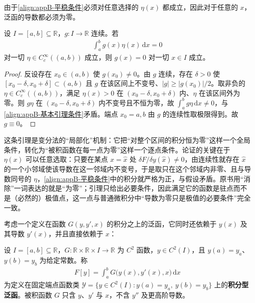 \documentclass[../main.tex]{subfiles}
\begin{document}
由于\eqref{align:appB-平稳条件}必须对任意选择的 $\eta(x)$ 都成立，因此对于任意的 $x$，泛函的导数都必须为零。

\begin{proposition}[变分法的基本引理]\label{proposition:appB-基本引理}
设 $I=[a,b]\subseteq\mathbb{R}$，$g:I\to\mathbb{R}$ 连续。若
\begin{align}
  \int_{a}^{b}g(x)\eta(x)\,\mathrm{d}x=0
  \label{align:appB-基本引理条件}
\end{align}
对一切 $\eta\in C_{c}^{\infty}((a,b))$ 成立，则 $g(x)=0$ 对一切 $x\in I$ 成立。
\end{proposition}

\begin{proof}
反设存在 $x_{0}\in(a,b)$ 使 $g(x_{0})\neq0$。由 $g$ 连续，存在 $\delta>0$ 使 $[x_{0}-\delta,x_{0}+\delta]\subset(a,b)$ 且 $g$ 在该区间上不变号、$|g|\geqslant|g(x_{0})|/2$。取非负的 $\eta\in C_{c}^{\infty}((a,b))$，满足 $\eta(x)>0$ 在 $(x_{0}-\delta,x_{0}+\delta)$ 内、$\eta$ 在该区间外为零。则 $g\eta$ 在 $(x_{0}-\delta,x_{0}+\delta)$ 内不变号且不恒为零，故 $\int_{a}^{b}g\eta\,\mathrm{d}x\neq0$，与\eqref{align:appB-基本引理条件}矛盾。端点 $x_{0}=a,b$ 由 $g$ 的连续性取极限得到。故 $g\equiv0$。
\end{proof}

\begin{remark}
这条引理是变分法的“局部化”机制：它把“对整个区间的积分恒为零”这样一个全局条件，转化为“被积函数在每一点为零”这样一个逐点条件。论证的关键在于 $\eta(x)$ 可以任意选取：只要在某点 $x=\hat{x}$ 处 $\delta F/\delta y(\hat{x})\neq0$，由连续性就存在 $\hat{x}$ 的一个小邻域使该导数在这一邻域内不变号，于是取只在这个邻域内非零、且与导数同号的 $\eta$，\eqref{align:appB-平稳条件}中的积分就严格为正，与假设矛盾。原书用“消除”一词表达的就是“为零”；引理只给出必要条件，因此满足它的函数是驻点而不是（必然的）极值点，这一点与普通微积分中“导数为零只是极值的必要条件”完全一致。
\end{remark}

考虑一个定义在函数 $G(y,y',x)$ 的积分之上的泛函，它同时还依赖于 $y(x)$ 及其导数 $y'(x)$，并且直接依赖于 $x$：
\begin{definition}[积分型泛函]\label{definition:appB-积分型泛函}
设 $I=[a,b]\subseteq\mathbb{R}$，$G:\mathbb{R}\times\mathbb{R}\times I\to\mathbb{R}$ 为 $C^{2}$ 函数，$y\in C^{2}(I)$，且 $y(a)=y_{a}$、$y(b)=y_{b}$ 为给定常数。称
\begin{align}
  F[y]=\int_{a}^{b}G\bigl(y(x),y'(x),x\bigr)\,\mathrm{d}x
  \label{align:appB-积分型泛函}
\end{align}
为定义在固定端点函数类 $\mathcal{Y}=\{y\in C^{2}(I):y(a)=y_{a},\ y(b)=y_{b}\}$ 上的\textbf{积分型泛函}。被积函数 $G$ 只含 $y$、$y'$ 与 $x$，不含 $y''$ 及更高阶导数。
\end{definition}
\end{document}
